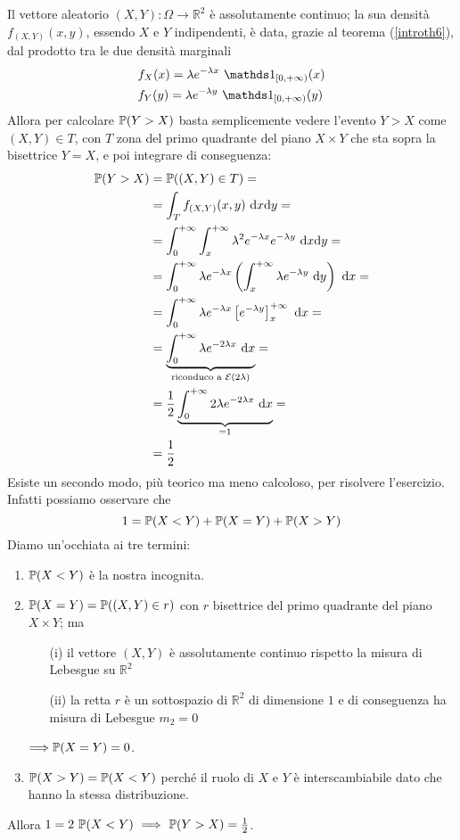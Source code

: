\Soluzione{}
Il vettore aleatorio $(X,Y):\Omega\to\mathbb{R}^2$ è assolutamente continuo; la sua densità $f_{(X,Y)}(x,y)$, essendo $X$ e $Y$ indipendenti, è data, grazie al  teorema (\ref{introth6}), dal prodotto tra le due densità marginali
\begin{gather*}
\begin{aligned}
&f_X(x)=\lambda e^{-\lambda x}\ \Ind_{[0,+\infty)}(x) \\
&f_Y(y)=\lambda e^{-\lambda y}\ \Ind_{[0,+\infty)}(y)
\end{aligned}
\end{gather*}
Allora per calcolare $\mathbb{P}(Y>X)$ basta semplicemente vedere l'evento $Y>X$ come $(X,Y)\in T$, con $T$ zona del primo quadrante del piano $X\times Y$ che sta sopra la bisettrice $Y=X$, e poi integrare di conseguenza:
\begin{gather*}
\begin{aligned}
\mathbb{P}(Y>X)&=\mathbb{P}((X,Y)\in T)= \\
&=\int_T f_{(X,Y)}(x,y) \text{ d}x\text{d}y= \\
&=\int_0^{+\infty} \int_{x}^{+\infty}\lambda^2e^{-\lambda x}e^{-\lambda y}\text{ d}x\text{d}y= \\
&=\int_0^{+\infty}\lambda e^{-\lambda x} \left(\int_{x}^{+\infty} \lambda e^{-\lambda y}  \text{ d}y  \right)\text{ d}x= \\
&=\int_0^{+\infty}\lambda e^{-\lambda x} \left[ e^{-\lambda y}  \right]_x^{+\infty}\text{ d}x=\\
&=\underbrace{\int_0^{+\infty}\lambda e^{-2\lambda x}\text{ d}x}_{\text{riconduco a }\mathcal{E}(2\lambda)}=\\
&=\frac{1}{2}\underbrace{\int_0^{+\infty}2\lambda e^{-2\lambda x}\text{ d}x}_{=1}=\\
&=\frac{1}{2}
\end{aligned}
\end{gather*}
Esiste un secondo modo, più teorico ma meno calcoloso, per risolvere l'esercizio. Infatti possiamo osservare che
\begin{equation*}
1=\mathbb{P}(X<Y)+\mathbb{P}(X=Y)+\mathbb{P}(X>Y)
\end{equation*}
Diamo un'occhiata ai tre termini:
\begin{enumerate}
\item $\mathbb{P}(X<Y)$ è la nostra incognita.
\item $\mathbb{P}(X=Y)=\mathbb{P}((X,Y)\in r)$ con $r$ bisettrice del primo quadrante del piano $X\times Y$; ma
\begin{enumerate} 
\item [(i)] il vettore $(X,Y)$ è assolutamente continuo rispetto la misura di Lebesgue su $\mathbb{R}^2$
\item [(ii)] la retta $r$ è un sottospazio di $\mathbb{R}^2$ di dimensione $1$ e di conseguenza ha misura di Lebesgue $m_2=0$
\end{enumerate}
$\Longrightarrow \mathbb{P}(X=Y)=0$.
\item $\mathbb{P}(X>Y)=\mathbb{P}(X<Y)$ perché il ruolo di $X$ e $Y$ è interscambiabile dato che hanno la stessa distribuzione.
\end{enumerate}
Allora $1=2\ \PP(X<Y)\ \Longrightarrow\ \PP(Y>X)=\frac{1}{2}$.

